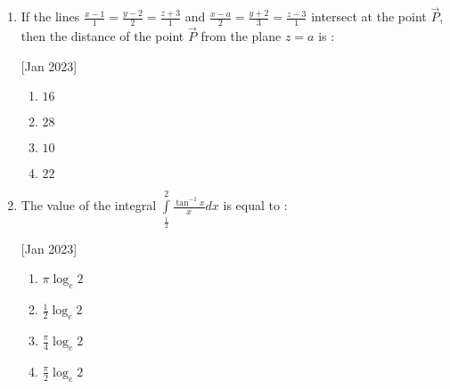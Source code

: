 \documentclass[journal,12pt,twocolumn]{IEEEtran}
\theoremstyle{remark}
\begin{document}
\begin{enumerate}
    \hfill[Jan 2023]
        \begin{enumerate}
            \item $\frac{5}{\sqrt{2}}$
            \item $\frac{1}{5}$
            \item $\frac{1}{\sqrt{2}}$
            \item $\frac{3}{\sqrt{2}}$
        \end{enumerate}

    \item If the lines $\frac{x-1}{1} = \frac{y-2}{2} = \frac{z+3}{1}$ and $\frac{x-a}{2} = \frac{y+2}{3} = \frac{z-3}{1}$ intersect at the point $\vec{P}$, then the distance of the point $\vec{P}$ from the plane $z=a$ is :
    
    \hfill[Jan 2023]
        \begin{enumerate}
            \item $16$
            \item $28$
            \item $10$
            \item $22$
        \end{enumerate}

    \item The value of the integral $\int\limits_\frac{1}{2}^2\frac{\tan^{-1}x}{x}dx$ is equal to :
    
    \hfill[Jan 2023]
        \begin{enumerate}
            \item $\pi\log_e2$
            \item $\frac{1}{2}\log_e2$
            \item $\frac{\pi}{4}\log_e2$
            \item $\frac{\pi}{2}\log_e2$
        \end{enumerate}

\end{enumerate}
\end{document}
